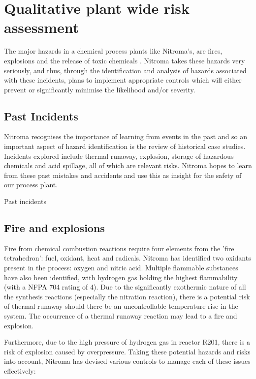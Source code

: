 \section{Qualitative plant wide risk assessment}

The major hazards in a chemical process plants like Nitroma’s, are fires, explosions and the release of toxic chemicals \cite{mannan_lees_2012}. Nitroma takes these hazards very seriously, and thus, through the identification and analysis of hazards associated with these incidents, plans to implement appropriate controls which will either prevent or significantly minimise the likelihood and/or severity. 


\subsection{Past Incidents}

Nitroma recognises the importance of learning from events in the past and so an important aspect of hazard identification is the review of historical case studies. Incidents explored include thermal runaway, explosion, storage of hazardous chemicals and acid spillage, all of which are relevant risks. Nitroma hopes to learn from these past mistakes and accidents and use this as insight for the safety of our process plant.

\begin{table}[h]
    \caption{Past incidents}
    
\end{table}

\subsection{Fire and explosions}

Fire from chemical combustion reactions require four elements from the 'fire tetrahedron': fuel, oxidant, heat and radicals. Nitroma has identified two oxidants present in the process: oxygen and nitric acid. Multiple flammable substances have also been identified, with hydrogen gas holding the highest flammability (with a NFPA 704 rating of 4). Due to the significantly exothermic nature of all the synthesis reactions (especially the nitration reaction), there is a potential risk of thermal runaway should there be an uncontrollable temperature rise in the system. The occurrence of a thermal runaway reaction may lead to a fire and explosion.  

Furthermore, due to the high pressure of hydrogen gas in reactor R201, there is a risk of explosion caused by overpressure. Taking these potential hazards and risks into account, Nitroma has devised various controls to manage each of these issues effectively: 


